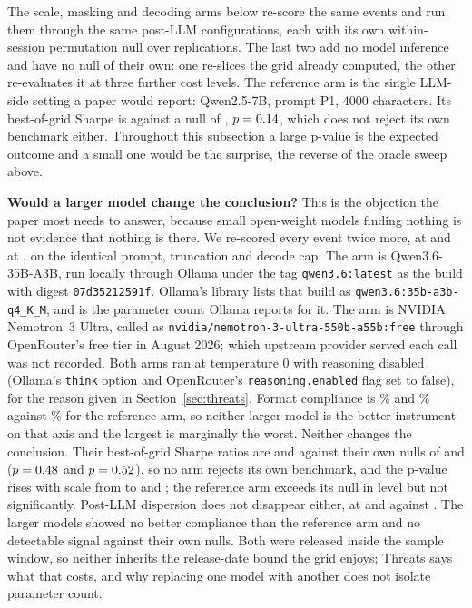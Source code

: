 \documentclass[sigconf]{acmart}
\begin{document}
The scale, masking and decoding arms below re-score the same events and run them through the same
\NumPostConfigs{} post-LLM configurations, each with its own within-session permutation null over
\ProbePermReps{} replications. The last two add no model inference and have no null of their own:
one re-slices the grid already computed, the other re-evaluates it at three further cost levels. The reference arm is the single LLM-side setting a paper would report:
Qwen2.5-7B, prompt P1, 4000 characters. Its best-of-grid Sharpe is \ArmMax{} against a null of
\ArmNullMax{}, $p=0.14{}$, which does not reject its own benchmark either. Throughout this
subsection a large p-value is the expected outcome and a small one would be the surprise, the
reverse of the oracle sweep above.

\textbf{Would a larger model change the conclusion?} This is the objection the paper most needs to
answer, because small open-weight models finding nothing is not evidence that nothing is there. We
re-scored every event twice more, at \ScaleParams{} and at \BigParams{}, on the identical prompt,
truncation and decode cap. The \ScaleParams{} arm is Qwen3.6-35B-A3B, run locally through Ollama
under the tag \nolinkurl{qwen3.6:latest} as the build with digest \texttt{07d35212591f}. Ollama's
library lists that build as \nolinkurl{qwen3.6:35b-a3b-q4_K_M}, and \ScaleParams{} is the parameter
count Ollama reports for it. The \BigParams{} arm is NVIDIA Nemotron~3 Ultra, called as
\nolinkurl{nvidia/nemotron-3-ultra-550b-a55b:free} through OpenRouter's free tier in August 2026;
which upstream provider served each call was not recorded. Both arms ran at temperature 0 with
reasoning disabled (Ollama's \texttt{think} option and OpenRouter's \texttt{reasoning.enabled} flag
set to false), for the reason given in Section~\ref{sec:threats}. Format compliance is \ScaleCompliance{}\% and \BigCompliance{}\% against
\ArmCompliance{}\% for the reference arm, so neither larger model is the better instrument on that
axis and the largest is marginally the worst. Neither changes the conclusion. Their
best-of-grid Sharpe ratios are \ScaleMax{} and \BigMax{} against their own nulls of
\ScaleNullMax{} and \BigNullMax{} ($p=0.48{}$ and $p=0.52{}$), so no arm rejects its own
benchmark, and the p-value rises with scale from \ArmPermP{} to \ScalePermP{} and \BigPermP{}; the
reference arm exceeds its null in level but not significantly.
Post-LLM dispersion does not disappear either, at \ScaleSD{} and \BigSD{} against \ArmSD{}. The
larger models showed no better compliance than the reference arm and no detectable signal against
their own nulls. Both were released inside the sample window, so
neither inherits the release-date bound the grid enjoys; Threats says what that costs, and why
replacing one model with another does not isolate parameter count.
\end{document}
